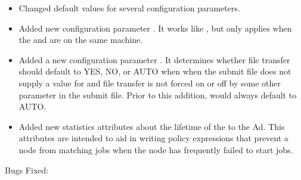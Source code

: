 \begin{itemize}
\item Changed default values for several configuration parameters.

\item Added new configuration parameter .
It works like , but only applies when the
 and  are on the same machine.

\item Added a new configuration parameter .
It determines whether file transfer should default to YES, NO, or AUTO when when the submit file
does not supply a value for  and file transfer is not forced
on or off by some other parameter in the submit file.  Prior to this addition,  would
always default to AUTO.

\item Added new statistics attributes about the lifetime of the  to the  Ad.
This attributes are intended to aid in writing policy expressions that prevent a node from matching jobs
when the node has frequently failed to start jobs.

\end{itemize}

\noindent Bugs Fixed:


